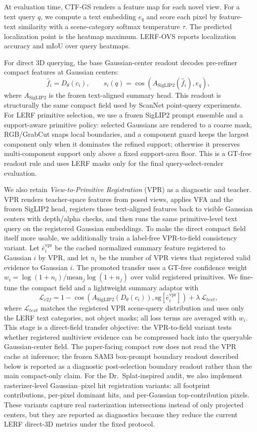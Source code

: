 \documentclass[10pt,twocolumn,letterpaper]{article}
\newcommand{\method}{CTF-GS}
\begin{document}
At evaluation time, \method{} renders a feature map for each novel view. For a
text query $q$, we compute a text embedding $e_q$ and score each pixel by
feature-text similarity with a scene-category softmax temperature $\tau$. The
predicted localization point is the heatmap maximum. LERF-OVS reports
localization accuracy and mIoU over query heatmaps.

For direct 3D querying, the base Gaussian-center readout decodes pre-refiner
compact features at Gaussian centers:
\[
  \hat{f}_i = D_{\theta}(c_i), \qquad
  s_i(q) = \cos(A_{\mathrm{SigLIP2}}(\hat{f}_i), e_q),
\]
where $A_{\mathrm{SigLIP2}}$ is the frozen text-aligned summary head. This
readout is structurally the same compact field used by ScanNet point-query
experiments. For LERF primitive selection, we use a frozen SigLIP2 prompt
ensemble and a support-aware primitive policy: selected Gaussians are rendered
to a coarse mask, RGB/GrabCut snaps local boundaries, and a component guard keeps
the largest component only when it dominates the refined support; otherwise it
preserves multi-component support only above a fixed support-area floor. This is
a GT-free readout rule and uses LERF masks only for the final query-select-render
evaluation.

We also retain \emph{View-to-Primitive Registration} (VPR) as a diagnostic and
teacher. VPR renders teacher-space features from posed views, applies VFA and
the frozen SigLIP2 head, registers those text-aligned features back to visible
Gaussian centers with depth/alpha checks, and then runs the same primitive-level
text query on the registered Gaussian embeddings.
To make the direct compact field itself more usable, we additionally train a
label-free VPR-to-field consistency variant. Let $\bar{e}^{\mathrm{vpr}}_i$ be
the cached normalized summary feature registered to Gaussian $i$ by VPR, and
let $n_i$ be the number of VPR views that registered valid evidence to
Gaussian $i$. The promoted transfer uses a GT-free confidence weight
$w_i=\log(1+n_i)/\mathrm{mean}_j\log(1+n_j)$ over valid registered primitives.
We fine-tune the compact field and a lightweight summary adaptor with
\[
  \mathcal{L}_{v2f}
  = 1 - \cos(A_{\mathrm{SigLIP2}}(D_{\theta}(c_i)),
             \mathrm{sg}[\bar{e}^{\mathrm{vpr}}_i])
  + \lambda\,\mathcal{L}_{text},
\]
where $\mathcal{L}_{text}$ matches the registered VPR scene-query distribution
and uses only the LERF text categories, not object masks; all loss terms are
averaged with $w_i$. This stage is a direct-field transfer objective: the
VPR-to-field variant tests whether registered multiview evidence can be
compressed back into the queryable Gaussian-center field. The paper-facing
compact row does not read the VPR cache at inference; the frozen SAM3
box-prompt boundary readout described below is reported as a diagnostic
post-selection boundary readout rather than the main compact-only claim.
For the Dr.~Splat-inspired audit, we also implement rasterizer-level
Gaussian--pixel hit registration variants: all footprint contributions,
per-pixel dominant hits, and per-Gaussian top-contribution pixels. These variants
capture real rasterization intersections instead of only projected centers, but
they are reported as diagnostics because they reduce the current LERF direct-3D
metrics under the fixed protocol.
\end{document}
